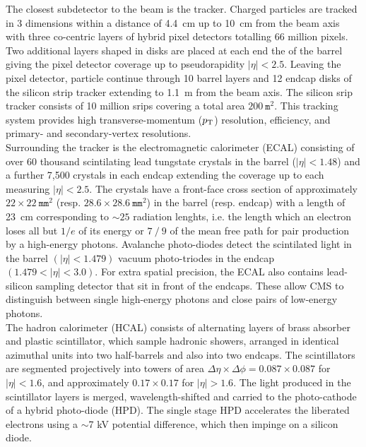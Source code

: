 The closest subdetector to the beam is the tracker. Charged particles are tracked in 
3 dimensions within a distance of 4.4~cm up to 10~cm from the beam axis with three co-centric layers of hybrid 
pixel detectors totalling 66 million pixels. Two additional layers shaped in disks are placed at each 
end the of the barrel giving the pixel detector coverage up to pseudorapidity $|\eta| < 2.5$.
Leaving the pixel detector, particle continue through 10 barrel layers and 12 endcap disks 
of the silicon strip tracker extending to 1.1~m from the beam axis. The silicon srip tracker
consists of 10 million srips covering a total area $200~\texttt{m}^2$.  This tracking system
provides high transverse-momentum ($p_{\mathrm{T}}$) resolution, efficiency, and primary- and secondary-vertex
resolutions.\\
\indent Surrounding the tracker is the electromagnetic calorimeter (ECAL) consisting of over 60 thousand scintilating 
lead tungstate crystals in the barrel ($|\eta| < 1.48$) and a further 7,500 crystals in each endcap extending
the coverage up to each measuring $|\eta| < 2.5$. The crystals have a front-face cross section
of approximately $22 \times 22~\texttt{mm}^2$ (resp. $28.6 \times 28.6~\texttt{mm}^2$) in the barrel (resp. endcap) with a
length of 23~cm corresponding to $\sim25$ radiation lenghts, i.e. the length which an electron loses
all but $1/e$ of its energy or $7⁄9$ of the mean free path for pair production by a high-energy photons.  
Avalanche photo-diodes detect the scintilated light in the barrel $(|\eta| < 1.479)$ vacuum photo-triodes 
in the endcap $(1.479 < |\eta| < 3.0)$. For extra spatial precision, the ECAL also contains lead-silicon 
sampling detector that sit in front of the endcaps. These allow CMS to distinguish between single high-energy 
photons and close pairs of low-energy photons.\\
\indent The hadron calorimeter (HCAL) consists of alternating layers of brass absorber
and plastic scintillator, which sample hadronic showers, arranged in identical azimuthal units 
into two half-barrels and also into two endcaps. The scintillators are segmented projectively 
into towers of area $\Delta\eta \times \Delta\phi = 0.087 \times 0.087$ for $|\eta| < 1.6$, and 
approximately $0.17 \times 0.17$ for $|\eta| > 1.6$. The light produced in the 
scintillator layers is merged, wavelength-shifted and carried to the photo-cathode 
of a hybrid photo-diode (HPD). The single stage HPD accelerates the liberated electrons 
using a $\sim$7 kV potential difference, which then impinge on a silicon diode. 
